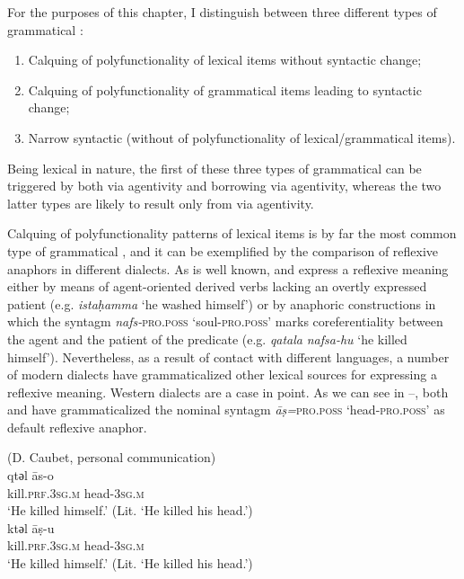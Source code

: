 \documentclass[output=paper]{langsci/langscibook}
\begin{document}
For the purposes of this chapter, I distinguish between three different types of grammatical : 

\begin{enumerate} 
\item Calquing of polyfunctionality of lexical items without syntactic change;
\item Calquing of polyfunctionality of grammatical items leading to syntactic change; 
\item Narrow syntactic  (without  of polyfunctionality of lexical/grammatical items).
\end{enumerate}

Being lexical in nature, the first of these three types of grammatical  can be triggered by both  via  agentivity and borrowing via  agentivity, whereas the two latter types are likely to result only from  via  agentivity. 

Calquing of polyfunctionality patterns of lexical items is by far the most common type of grammatical , and it can be exemplified by the comparison of reflexive anaphors in different  dialects. As is well known,  and   express a reflexive meaning either by means of agent-oriented derived verbs lacking an overtly expressed patient (e.g. \textit{istaḥamma} ‘he washed himself’) or by anaphoric constructions in which the syntagm \textit{nafs-}\textsc{pro.poss} ‘soul-\textsc{pro.poss’} marks coreferentiality between the agent and the patient of the predicate (e.g. \textit{qatala} \textit{nafsa-hu} ‘he killed himself’). Nevertheless, as a result of contact with different languages, a number of modern  dialects have grammaticalized other lexical sources for expressing a reflexive meaning. Western  dialects are a case in point. As we can see in --, both  and   have grammaticalized the nominal syntagm \textit{{\R}āṣ=}\textsc{pro.poss} ‘head-\textsc{pro.poss’} as default reflexive anaphor.

\ea\label{15}
{  (D. Caubet, personal communication)} \\
\gll   qtәl {\R}ās-o\\
       kill.\textsc{prf.3sg.m} head-\textsc{3sg.m}\\
\glt   `He killed himself.' (Lit. ‘He killed his head.’)
\ex \label{16}
{  \citep[16]{Taine-Cheikh2008chapter}}\\
\gll   ktәl {\R}āṣ-u\\
       kill.\textsc{prf.3sg.m} head-\textsc{3sg.m}\\
\glt   `He killed himself.' (Lit. ‘He killed his head.’)
\z
\end{document}

